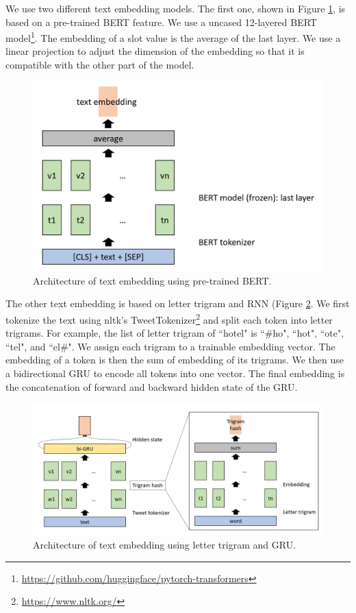 We use two different text embedding models. The first one, shown in Figure \ref{fig:bert}, is based on a pre-trained BERT \cite{devlin2018bert} feature. We use a uncased 12-layered BERT model\footnote{\url{https://github.com/huggingface/pytorch-transformers}}. The embedding of a slot value is the average of the last layer. We use a linear projection to adjust the dimension of the embedding so that it is compatible with the other part of the model.

\begin{figure}
    \centering
    \includegraphics[width=\columnwidth]{figures/bert.png}
    \caption[Text embedding using pre-trained BERT]{Architecture of text embedding using pre-trained BERT.}
    \label{fig:bert}
\end{figure}

The other text embedding is based on letter trigram and RNN (Figure \ref{fig:gru}. We first tokenize the text using nltk's TweetTokenizer\footnote{\url{https://www.nltk.org/}} and split each token into letter trigrams. For example, the list of letter trigram of ``hotel" is ``\#ho", ``hot", ``ote", ``tel", and ``el\#". We assign each trigram to a trainable embedding vector. The embedding of a token is then the sum of embedding of its trigrams. We then use a bidirectional GRU to encode all tokens into one vector. The final embedding is the concatenation of forward and backward hidden state of the GRU.

\begin{figure}
    \centering
    \includegraphics[width=\columnwidth]{figures/lstm.png}
    \caption[Text embedding using letter trigram and GRU]{Architecture of text embedding using letter trigram and GRU.}
    \label{fig:gru}
\end{figure}


